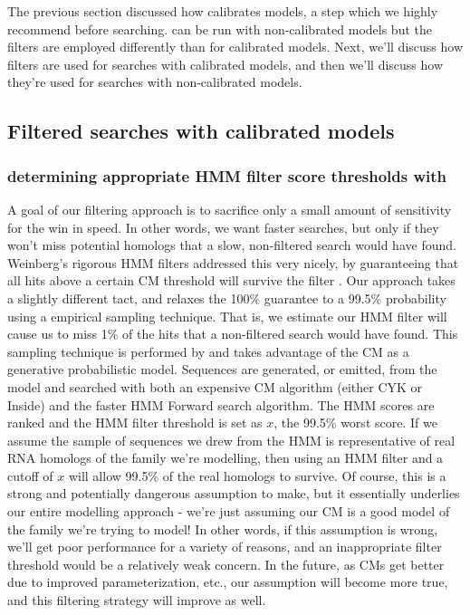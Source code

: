 The previous section discussed how  calibrates
models, a step which we highly recommend before searching.
 can be run with non-calibrated models but the 
filters are employed differently than for calibrated models.  Next,
we'll discuss how filters are used for searches with calibrated
models, and then we'll discuss how they're used for searches with
non-calibrated models.

\subsection{Filtered searches with calibrated models}

\subsubsection{determining appropriate HMM filter score thresholds with }
A goal of our filtering approach is to sacrifice only a small amount
of sensitivity for the win in speed. In other words, we want faster
searches, but only if they won't miss potential homologs that a slow,
non-filtered search would have found.  Weinberg's rigorous HMM filters
addressed this very nicely, by guaranteeing that all hits above a
certain CM threshold will survive the filter
\cite{WeinbergRuzzo04}. Our approach takes a slightly different tact,
and relaxes the 100\% guarantee to a 99.5\% probability using a
empirical sampling technique. That is, we estimate our HMM filter will
cause us to miss 1\% of the hits that a non-filtered search would have
found. This sampling technique is performed by  and
takes advantage of the CM as a generative probabilistic model.
Sequences are generated, or emitted, from the model and searched with
both an expensive CM algorithm (either CYK or Inside) and the faster
HMM Forward search algorithm. The HMM scores are ranked and the HMM
filter threshold is set as $x$, the 99.5\% worst score. If we assume
the sample of sequences we drew from the HMM is representative of real
RNA homologs of the family we're modelling, then using an HMM filter
and a cutoff of $x$ will allow 99.5\% of the real homologs to
survive. Of course, this is a strong and potentially dangerous
assumption to make, but it essentially underlies our entire modelling
approach - we're just assuming our CM is a good model of the family
we're trying to model!  In other words, if this assumption is wrong,
we'll get poor performance for a variety of reasons, and an
inappropriate filter threshold would be a relatively weak concern.  In
the future, as CMs get better due to improved parameterization, etc.,
our assumption will become more true, and this filtering strategy will
improve as well. 

